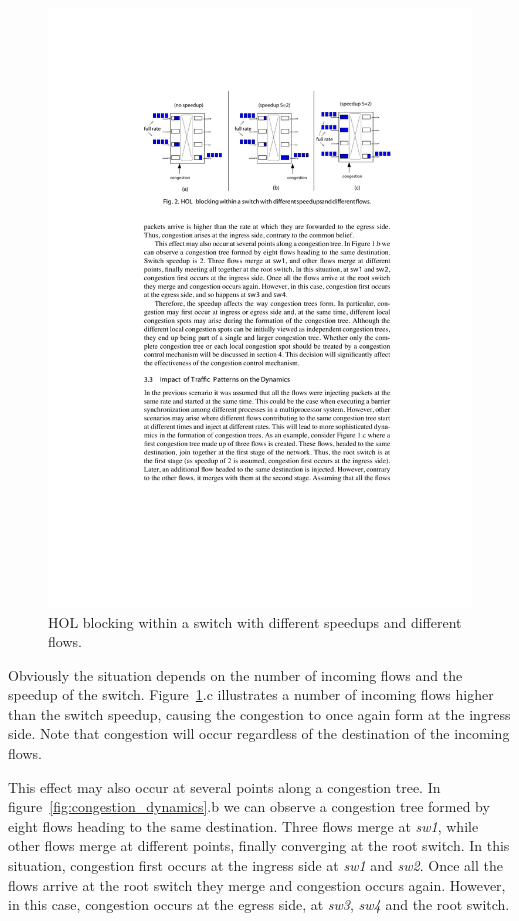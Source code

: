 \documentclass[12pt]{article}
\begin{document}
\begin{figure}[ht]
	\centering
		\includegraphics{figures/speedup_effect.pdf}
		\caption{HOL blocking within a switch with different speedups and different flows.}
		\label{fig:speedup_effect}
\end{figure}

Obviously the situation depends on the number of incoming flows and the speedup of the switch. Figure~\ref{fig:speedup_effect}.c illustrates a number of incoming flows higher than the switch speedup, causing the congestion to once again form at the ingress side. Note that congestion will occur regardless of the destination of the incoming flows. 

This effect may also occur at several points along a congestion tree. In figure~\ref{fig:congestion_dynamics}.b we can observe a congestion tree formed by eight flows heading to the same destination. Three flows merge at \emph{sw1}, while other flows merge at different points, finally converging at the root switch. In this situation, congestion first occurs at the ingress side at \emph{sw1} and \emph{sw2}. Once all the flows arrive at the root switch they merge and congestion occurs again. However, in this case, congestion occurs at the egress side, at \emph{sw3}, \emph{sw4} and the root switch.
\end{document}

